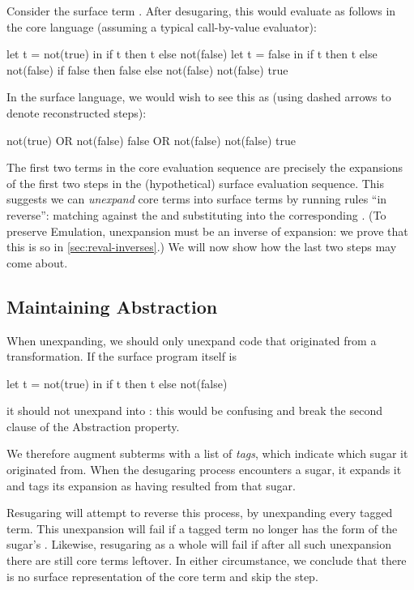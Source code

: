 Consider the surface term . After
desugaring, this would evaluate as follows in the core language
(assuming a typical call-by-value evaluator):
\begin{Codes}
    let t = not(true) in
      if t then t else not(false)
\CoreStep let t = false in
      if t then t else not(false)
\CoreStep if false then false else not(false)
\CoreStep not(false)
\CoreStep true
\end{Codes}
In the surface language, we would wish to see this as (using dashed
arrows to denote reconstructed steps):
\begin{Codes}
    not(true) OR not(false)
\SurfStep false OR not(false)
\SurfStep not(false)
\SurfStep true
\end{Codes}
The first two terms in the core evaluation sequence are precisely the
expansions of the first two steps in the (hypothetical) surface evaluation
sequence. This suggests
we can \emph{unexpand} core terms into surface terms by running rules ``in
reverse'': matching against the  and substituting into the
corresponding .
(To preserve Emulation, unexpansion must be an inverse of expansion: we
prove that this is so in \cref{sec:reval-inverses}.)
We will now show how the last two steps
may come about.

\subsection{Maintaining Abstraction}
\label{sec:reval-exposition-tagging}

When unexpanding, we should only unexpand code that
originated from a transformation. If the surface program itself is
\begin{Codes}
let t = not(true) in
  if t then t else not(false)
\end{Codes}
it should not unexpand into :
this would be confusing and break the second clause of the Abstraction property.

We therefore augment subterms with a list of \emph{tags}, which
indicate which sugar it originated from.
When the desugaring process encounters a sugar, it expands it and
tags its expansion as having resulted from that sugar.

Resugaring will attempt to reverse this process, by unexpanding every
tagged term. This unexpansion will fail if a tagged term no longer has
the form of the sugar's . Likewise, resugaring as a whole will
fail if after all such unexpansion there are still core terms
leftover. In either circumstance, we conclude that there is no
surface representation of the core term and skip the step.

